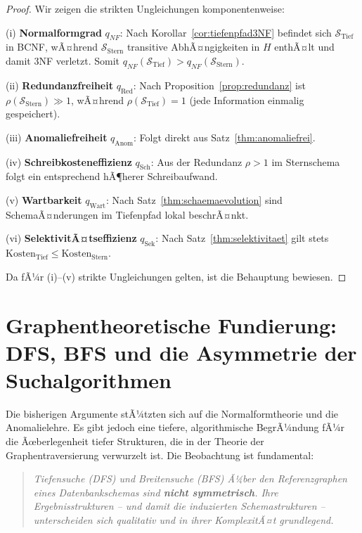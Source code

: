 ﻿\documentclass[12pt,a4paper]{article}
\theoremstyle{definition}
\theoremstyle{remark}
\newcommand{\NF}{\mathit{NF}}
\begin{document}
\begin{proof}
Wir zeigen die strikten Ungleichungen komponentenweise:

\medskip
(i) \textbf{Normalformgrad} $q_{\NF}$: Nach Korollar~\ref{cor:tiefenpfad3NF}
befindet sich $\mathcal{S}_{\text{Tief}}$ in BCNF, wÃ¤hrend
$\mathcal{S}_{\text{Stern}}$ transitive AbhÃ¤ngigkeiten in $H$ enthÃ¤lt
und damit 3NF verletzt. Somit $q_{\NF}(\mathcal{S}_{\text{Tief}}) > q_{\NF}(\mathcal{S}_{\text{Stern}})$.

(ii) \textbf{Redundanzfreiheit} $q_{\text{Red}}$: Nach Proposition~\ref{prop:redundanz}
ist $\rho(\mathcal{S}_{\text{Stern}}) \gg 1$, wÃ¤hrend
$\rho(\mathcal{S}_{\text{Tief}}) = 1$ (jede Information einmalig gespeichert).

(iii) \textbf{Anomaliefreiheit} $q_{\text{Anom}}$: Folgt direkt aus
Satz~\ref{thm:anomaliefrei}.

(iv) \textbf{Schreibkosteneffizienz} $q_{\text{Sch}}$: Aus der Redundanz
$\rho > 1$ im Sternschema folgt ein entsprechend hÃ¶herer Schreibaufwand.

(v) \textbf{Wartbarkeit} $q_{\text{Wart}}$: Nach Satz~\ref{thm:schaemaevolution}
sind SchemaÃ¤nderungen im Tiefenpfad lokal beschrÃ¤nkt.

(vi) \textbf{SelektivitÃ¤tseffizienz} $q_{\text{Sek}}$: Nach
Satz~\ref{thm:selektivitaet} gilt stets
$\text{Kosten}_{\text{Tief}} \leq \text{Kosten}_{\text{Stern}}$.

Da fÃ¼r (i)--(v) strikte Ungleichungen gelten, ist die Behauptung bewiesen.
\end{proof}

\section{Graphentheoretische Fundierung: DFS, BFS und die Asymmetrie der Suchalgorithmen}
\label{sec:dfs_bfs}

Die bisherigen Argumente stÃ¼tzten sich auf die Normalformtheorie und die
Anomalielehre. Es gibt jedoch eine tiefere, algorithmische BegrÃ¼ndung fÃ¼r
die Ãœberlegenheit tiefer Strukturen, die in der Theorie der Graphentraversierung
verwurzelt ist. Die Beobachtung ist fundamental:

\begin{quote}
\emph{Tiefensuche (DFS) und Breitensuche (BFS) Ã¼ber den Referenzgraphen eines
Datenbankschemas sind \textbf{nicht symmetrisch}. Ihre Ergebnisstrukturen --
und damit die induzierten Schemastrukturen -- unterscheiden sich qualitativ
und in ihrer KomplexitÃ¤t grundlegend.}
\end{quote}
\end{document}
